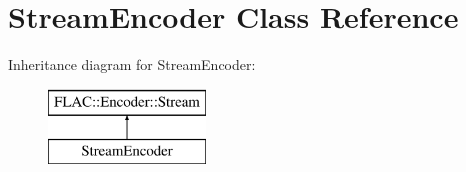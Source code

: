 \hypertarget{class_stream_encoder}{}\section{Stream\+Encoder Class Reference}
\label{class_stream_encoder}
Inheritance diagram for Stream\+Encoder\+:\begin{figure}[H]
\begin{center}
\leavevmode
\includegraphics[height=2.000000cm]{class_stream_encoder}
\end{center}
\end{figure}
